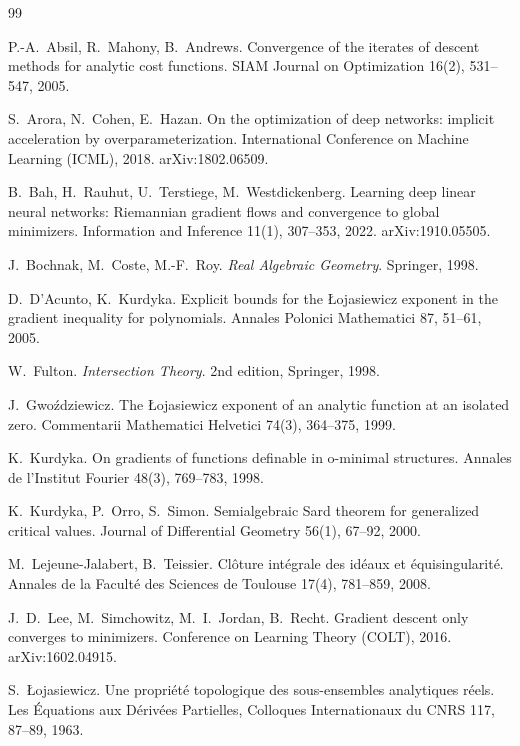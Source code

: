 \documentclass[11pt]{article}
\theoremstyle{definition}
\theoremstyle{remark}
\begin{document}
\begin{thebibliography}{99}\small

 P.-A.~Absil, R.~Mahony, B.~Andrews. Convergence of the iterates of descent methods for analytic cost functions. SIAM Journal on Optimization 16(2), 531--547, 2005.

 S.~Arora, N.~Cohen, E.~Hazan. On the optimization of deep networks: implicit acceleration by overparameterization. International Conference on Machine Learning (ICML), 2018. arXiv:1802.06509.

 B.~Bah, H.~Rauhut, U.~Terstiege, M.~Westdickenberg. Learning deep linear neural networks: Riemannian gradient flows and convergence to global minimizers. Information and Inference 11(1), 307--353, 2022. arXiv:1910.05505.

 J.~Bochnak, M.~Coste, M.-F.~Roy. \emph{Real Algebraic Geometry}. Springer, 1998.

 D.~D'Acunto, K.~Kurdyka. Explicit bounds for the {\L}ojasiewicz exponent in the gradient inequality for polynomials. Annales Polonici Mathematici 87, 51--61, 2005.

 W.~Fulton. \emph{Intersection Theory}. 2nd edition, Springer, 1998.

 J.~Gwo\'zdziewicz. The {\L}ojasiewicz exponent of an analytic function at an isolated zero. Commentarii Mathematici Helvetici 74(3), 364--375, 1999.

 K.~Kurdyka. On gradients of functions definable in o-minimal structures. Annales de l'Institut Fourier 48(3), 769--783, 1998.

 K.~Kurdyka, P.~Orro, S.~Simon. Semialgebraic Sard theorem for generalized critical values. Journal of Differential Geometry 56(1), 67--92, 2000.

 M.~Lejeune-Jalabert, B.~Teissier. Cl\^oture int\'egrale des id\'eaux et \'equisingularit\'e. Annales de la Facult\'e des Sciences de Toulouse 17(4), 781--859, 2008.

 J.~D.~Lee, M.~Simchowitz, M.~I.~Jordan, B.~Recht. Gradient descent only converges to minimizers. Conference on Learning Theory (COLT), 2016. arXiv:1602.04915.

 S.~{\L}ojasiewicz. Une propri\'et\'e topologique des sous-ensembles analytiques r\'eels. Les \'Equations aux D\'eriv\'ees Partielles, Colloques Internationaux du CNRS 117, 87--89, 1963.


\end{thebibliography}
\end{document}
